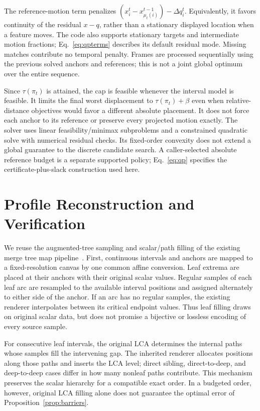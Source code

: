 \documentclass{vgtc}                %
\begin{document}
The reference-motion term penalizes
$(x_i^t-x_{\mu_t(i)}^{t-1})-\Delta q_i^t$.
Equivalently, it favors continuity of the residual $x-q$, rather than a stationary displayed location when a feature moves. The code also supports stationary targets and intermediate motion fractions; Eq.~\ref{eq:qpterms} describes its default residual mode. Missing matches contribute no temporal penalty. Frames are processed sequentially using the previous solved anchors and references; this is not a joint global optimum over the entire sequence.

Since $\tau(\pi_t)$ is attained, the cap is feasible whenever the interval model is feasible. It limits the final worst displacement to $\tau(\pi_t)+\beta$ even when relative-distance objectives would favor a different absolute placement. It does not force each anchor to its reference or preserve every projected motion exactly. The solver uses linear feasibility/minimax subproblems and a constrained quadratic solve with numerical residual checks. Its fixed-order convexity does not extend a global guarantee to the discrete candidate search. A caller-selected absolute reference budget is a separate supported policy; Eq.~\ref{eq:qp} specifies the certificate-plus-slack construction used here.

\section{Profile Reconstruction and Verification}\label{sec:rendering}
We reuse the augmented-tree sampling and scalar/path filling of the existing merge tree map pipeline~\cite{Koepp:2023:TMTM,STMTM:2026}. First, continuous intervals and anchors are mapped to a fixed-resolution canvas by one common affine conversion. Leaf extrema are placed at their anchors with their original scalar values. Regular samples of each leaf arc are resampled to the available interval positions and assigned alternately to either side of the anchor. If an arc has no regular samples, the existing renderer interpolates between its critical endpoint values. Thus leaf filling draws on original scalar data, but does not promise a bijective or lossless encoding of every source sample.

For consecutive leaf intervals, the original LCA determines the internal paths whose samples fill the intervening gap. The inherited renderer allocates positions along those paths and inserts the LCA level; direct sibling, direct-to-deep, and deep-to-deep cases differ in how many nonleaf paths contribute. This mechanism preserves the scalar hierarchy for a compatible exact order. In a budgeted order, however, original LCA filling alone does not guarantee the optimal error of Proposition~\ref{prop:barriers}.
\end{document}
